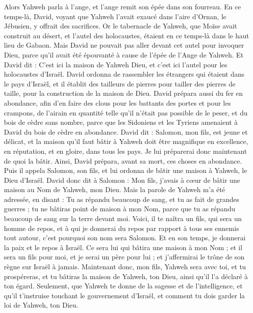 \begin{multicols}{2}
Alors Yahweh parla à l'ange, et l'ange remit son épée dans son fourreau.
En ce temps-là, David, voyant que Yahweh l'avait exaucé dans l'aire d'Ornan, le Jébusien, y offrait des sacrifices.
Or le tabernacle de Yahweh, que Moïse avait construit au désert, et l'autel des holocaustes, étaient en ce temps-là dans le haut lieu de Gabaon.
Mais David ne pouvait pas aller devant cet autel pour invoquer Dieu, parce qu'il avait été épouvanté à cause de l'épée de l'Ange de Yahweh.
\VerseOne{}Et David dit : C'est ici la maison de Yahweh Dieu, et c'est ici l'autel pour les holocaustes d'Israël.
David ordonna de rassembler les étrangers qui étaient dans le pays d'Israël, et il établit des tailleurs de pierres pour tailler des pierres de taille, pour la construction de la maison de Dieu.
David prépara aussi du fer en abondance, afin d'en faire des clous pour les battants des portes et pour les crampons,  de l’airain en quantité telle qu’il n’était pas possible de le peser,
et du bois de cèdre sans nombre, parce que les Sidoniens et les Tyriens amenaient à David du bois de cèdre en abondance.
David dit : Salomon, mon fils, est jeune et délicat, et la maison qu'il faut bâtir à Yahweh doit être magnifique en excellence, en réputation, et en gloire, dans tous les pays. Je lui préparerai donc maintenant de quoi la bâtir. Ainsi, David prépara, avant sa mort, ces choses en abondance.
Puis il appela Salomon, son fils, et lui ordonna de bâtir une maison à Yahweh, le Dieu d'Israël.
David donc dit à Salomon : Mon fils, j’avais à cœur de bâtir une maison au Nom de Yahweh, mon Dieu.
Mais la parole de Yahweh m'a été adressée, en disant : Tu as répandu beaucoup de sang, et tu as fait de grandes guerres ; tu ne bâtiras point de maison à mon Nom, parce que tu as répandu beaucoup de sang sur la terre devant moi.
Voici, il te naîtra un fils, qui sera un homme de repos,  et à qui je donnerai du repos par rapport à tous ses ennemis tout autour, c'est pourquoi son nom sera Salomon. Et en son temps, je donnerai la paix et le repos à Israël.
Ce sera lui qui bâtira une maison à mon Nom ; et il sera un fils pour moi, et je serai un père pour lui ; et j'affermirai le trône de son règne sur Israël à jamais.
Maintenant donc, mon fils, Yahweh sera avec toi, et tu prospéreras, et tu bâtiras la maison de Yahweh, ton Dieu, ainsi qu'il l’a déclaré à ton égard.
Seulement, que Yahweh te donne de la sagesse et de l'intelligence, et qu'il t'instruise touchant le gouvernement d'Israël, et comment tu dois garder la loi de Yahweh, ton Dieu.

\end{multicols}
